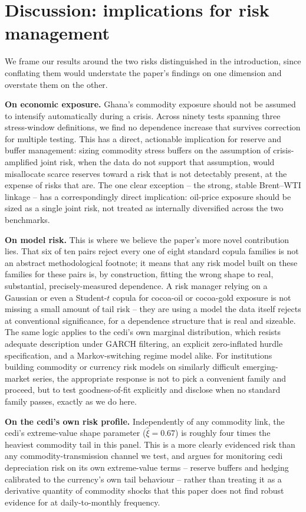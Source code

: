 \documentclass[final,3p,times,authoryear]{elsarticle}
\begin{document}
\section{Discussion: implications for risk management}
\label{sec:discussion}

We frame our results around the two risks distinguished in the
introduction, since conflating them would understate the paper's
findings on one dimension and overstate them on the other.

\textbf{On economic exposure.} Ghana's commodity exposure should not be
assumed to intensify automatically during a crisis. Across ninety tests
spanning three stress-window definitions, we find no dependence increase
that survives correction for multiple testing. This has a direct,
actionable implication for reserve and buffer management: sizing
commodity stress buffers on the assumption of crisis-amplified joint
risk, when the data do not support that assumption, would misallocate
scarce reserves toward a risk that is not detectably present, at the
expense of risks that are. The one clear exception -- the strong,
stable Brent--WTI linkage -- has a correspondingly direct implication:
oil-price exposure should be sized as a single joint risk, not treated
as internally diversified across the two benchmarks.

\textbf{On model risk.} This is where we believe the paper's more
novel contribution lies. That six of ten pairs reject every one of eight
standard copula families is not an abstract methodological footnote; it
means that any risk model built on these families for these pairs is,
by construction, fitting the wrong shape to real, substantial,
precisely-measured dependence. A risk manager relying on a Gaussian or
even a Student-$t$ copula for cocoa-oil or cocoa-gold exposure is not
missing a small amount of tail risk -- they are using a model the data
itself rejects at conventional significance, for a dependence structure
that is real and sizeable. The same logic applies to the cedi's own
marginal distribution, which resists adequate description under
GARCH filtering, an explicit zero-inflated hurdle specification, and a
Markov-switching regime model alike. For institutions building
commodity or currency risk models on similarly difficult emerging-market
series, the appropriate response is not to pick a convenient family and
proceed, but to test goodness-of-fit explicitly and disclose when no
standard family passes, exactly as we do here.

\textbf{On the cedi's own risk profile.} Independently of any commodity
link, the cedi's extreme-value shape parameter ($\hat\xi = 0.67$) is
roughly four times the heaviest commodity tail in this panel. This is a
more clearly evidenced risk than any commodity-transmission channel we
test, and argues for monitoring cedi depreciation risk on its own
extreme-value terms -- reserve buffers and hedging calibrated to the
currency's own tail behaviour -- rather than treating it as a derivative
quantity of commodity shocks that this paper does not find robust
evidence for at daily-to-monthly frequency.
\end{document}
